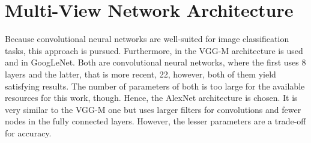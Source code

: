 \section{Multi-View Network Architecture}
\label{sec:methods-architecture}
Because convolutional neural networks are well-suited for image classification tasks, this approach is pursued.
Furthermore, in \cite{Su:2015:MCN:2919332.2919750} the VGG-M\cite{journals/corr/ChatfieldSVZ14} architecture is used and in \cite{Feng2018} GoogLeNet\cite{szegedy2015}.
Both are convolutional neural networks, where the first uses 8 layers and the latter, that is more recent, 22, however, both of them yield satisfying results.
The number of parameters of both is too large for the available resources for this work, though.
Hence, the AlexNet architecture\cite{Krizhevsky:2012:ICD:2999134.2999257} is chosen.
It is very similar to the VGG-M one but uses larger filters for convolutions and fewer nodes in the fully connected layers.
However, the lesser parameters are a trade-off for accuracy.

